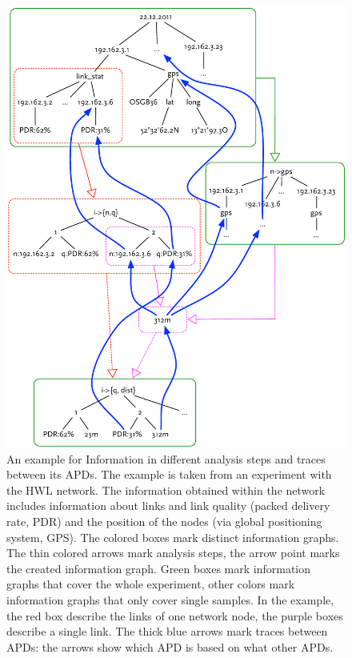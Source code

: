 \begin{figure}
  \centering
  \includegraphics[width=\linewidth]{figures/example_analysis_data}
  \caption{An example for Information in different analysis steps and traces between its APDs. The example is taken from an experiment with the HWL network. The information obtained within the network includes information about links and link quality (packed delivery rate, PDR) and the position of the nodes (via global positioning system, GPS). The colored boxes mark distinct information graphs. The thin colored arrows mark analysis steps, the arrow point marks the created information graph. Green boxes mark information graphs that cover the whole experiment, other colors mark information graphs that only cover single samples. In the example, the red box describe the links of one network node, the purple boxes describe a single link. The thick blue arrows mark traces between APDs: the arrows show which APD is based on what other APDs.}
  \label{fig:example_analysis_data}
\end{figure}

